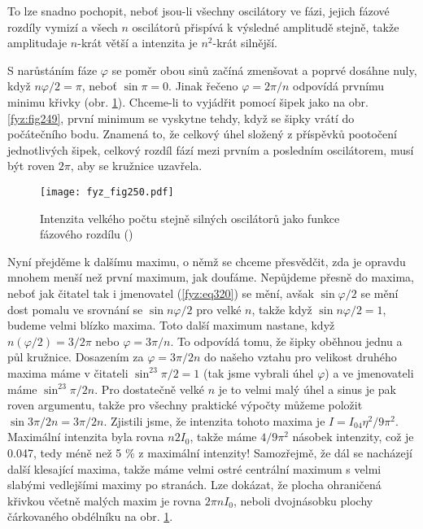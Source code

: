     To lze snadno pochopit, neboť jsou-li všechny oscilátory ve fázi, jejich fázové rozdíly vymizí 
    a všech \(n\) oscilátorů přispívá k výsledné amplitudě stejně, takže amplitudaje \(n\)-krát 
    větší a intenzita je \(n^2\)-krát silnější.
    
    S narůstáním fáze \(\varphi\) se poměr obou sinů začíná zmenšovat a poprvé dosáhne nuly, když 
    \(n\varphi/2 = \pi\), neboť \(\sin\pi = 0\). Jinak řečeno \(\varphi = 2\pi/n\) odpovídá prvnímu 
    minimu křivky (obr. \ref{fyz:fig250}). Chceme-li to vyjádřit pomocí šipek jako na obr. 
    \ref{fyz:fig249}, první minimum se vyskytne tehdy, když se šipky vrátí do počátečního bodu. 
    Znamená to, že celkový úhel složený z příspěvků pootočení jednotlivých šipek, celkový rozdíl 
    fází mezi prvním a posledním oscilátorem, musí být roven \(2\pi\), aby se kružnice uzavřela.

    \begin{figure}[ht!] %
      \centering
      \texttt{[image: fyz\_fig250.pdf]}
      \caption{Intenzita velkého počtu stejně silných oscilátorů jako funkce fázového rozdílu
               (\cite[s.~393]{Feynman01})}
      \label{fyz:fig250}
    \end{figure}
    
    Nyní přejděme k dalšímu maximu, o němž se chceme přesvědčit, zda je opravdu mnohem menší než 
    první maximum, jak doufáme. Nepůjdeme přesně do maxima, neboť jak čitatel tak i jmenovatel 
    (\ref{fyz:eq320}) se mění, avšak \(\sin\varphi/2\) se mění dost pomalu ve srovnání se \(\sin 
    n\varphi/2\) pro velké \(n\), takže když \(\sin n\varphi/2 = 1\), budeme velmi blízko maxima. 
    Toto další maximum nastane, když \(n(\varphi/2) = 3/2\pi\) nebo \(\varphi = 3\pi/n\). To 
    odpovídá tomu, že šipky oběhnou jednu a půl kružnice. Dosazením za \(\varphi = 3\pi/2n\) do 
    našeho vztahu pro velikost druhého maxima máme v čitateli \(\sin^23\pi/2 = 1\) (tak jsme 
    vybrali úhel \(\varphi\)) a ve jmenovateli máme \(\sin^23\pi/2n\). Pro dostatečně velké \(n\) 
    je to velmi malý úhel a sinus je pak roven argumentu, takže pro všechny praktické výpočty 
    můžeme položit \(\sin3\pi/2n = 3\pi/2n\). Zjistili jsme, že intenzita tohoto maxima je \(I = 
    I_04η^2/9\pi^2\). Maximální intenzita byla rovna \(n2I_0\), takže máme \(4/9\pi^2\) násobek 
    intenzity, což je \num{0.047}, tedy méně než 5 \% z maximální intenzity! Samozřejmě, že 
    dál se nacházejí další klesající maxima, takže máme velmi ostré centrální maximum s velmi 
    slabými vedlejšími maximy po stranách. Lze dokázat, že plocha ohraničená křivkou včetně malých 
    maxim je rovna \(2\pi nI_0\), neboli dvojnásobku plochy čárkovaného obdélníku na obr. 
    \ref{fyz:fig250}.

